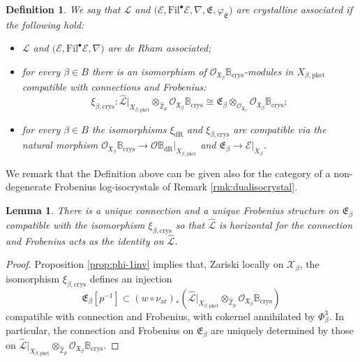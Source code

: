 \documentclass[asterisque,english]{smfart}
\newtheorem{definition}{Definition}[]
\newtheorem{lemma}[theo]{Lemma}
\begin{document}
\begin{definition}\label{def:crysass}  We say that $\mathcal{L}$ and $\bigl(\mathcal{E},\mathrm{Fil}^\bullet \mathcal{E}, \nabla,\mathfrak{E},\varphi_{\mathfrak{E}}\bigr) $ are  crystalline  associated  if the following hold:

\begin{itemize} 

\item[i.]  $\mathcal{L}$ and $\bigl(\mathcal{E},\mathrm{Fil}^\bullet \mathcal{E},\nabla\bigr)$ are de Rham associated;

\item[ii.] for every $\beta\in B$ there is an isomorphism of $\mathcal{O}_{\mathfrak{X}_\beta}\mathbb{B}_{\mathrm{crys}}$-modules in $X_{\beta,\mathrm{pket}}$  compatible with connections and Frobenius: $$\xi_{\beta,\mathrm{crys}}\colon \widehat{\mathcal{L}}\vert_{X_{\beta,\mathrm{pket}}}\otimes_{\widehat{\mathbb{Z}}_p} \mathcal{O}_{\mathfrak{X}_\beta} \mathbb{B}_{\mathrm{crys}}\cong \mathfrak{E}_\beta\otimes_{\mathcal{O}_{\mathfrak{X}_\beta}}  \mathcal{O}_{\mathfrak{X}_\beta}\mathbb{B}_{\mathrm{crys}};$$

\item[iii.] for every $\beta\in B$ the isomorphisms $\xi_{\mathrm{dR}}$ and $\xi_{\beta,\mathrm{crys}}$ are compatible via the natural morphism $\mathcal{O}_{\mathfrak{X}_\beta}\mathbb{B}_{\mathrm{crys}}\to \mathcal{O}\mathbb{B}_{\mathrm{dR}}\vert_{X_{\beta,\mathrm{pket}}}$ and $\mathfrak{E}_\beta\to \mathcal{E}\vert_{X_\beta}$. 

\end{itemize}
\end{definition}

We remark that the Definition above can be given also for the category of a non-degenerate Frobenius log-isocrystals of  Remark \ref{rmk:dualisocrystal}.

\begin{lemma}\label{lemma:uniquenabla}
There is a unique connection and a unique Frobenius structure on $\mathfrak{E}_\beta$ compatible with the isomorphism $\xi_{\beta,\mathrm{crys}}$ so that $\widehat{\mathcal{L}}$ is horizontal for the connection and Frobenius acts as the identity on $\widehat{\mathcal{L}}$.
\end{lemma} 
\begin{proof}
 Proposition \ref{prop:phi-1inv} implies that, Zariski locally on $\mathcal{X}_\beta$,  the isomorphism $\xi_{\beta,\mathrm{crys}}$ defines an injection $$\mathfrak{E}_\beta[p^{-1}]\subset   (w\circ \nu_{\mathrm{ar}})_\ast\left( \widehat{\mathcal{L}}\vert_{X_{\beta,\mathrm{pket}}}\otimes_{\widehat{\mathbb{Z}}_p} \mathcal{O}_{\mathfrak{X}_\beta} \mathbb{B}_{\mathrm{crys}}\right)$$compatible with connection and Frobenius, with cokernel annihilated by $\Phi_{\beta}^3$. In particular, the connection and Frobenius on $\mathfrak{E}_\beta$ are uniquely determined by those on $ \widehat{\mathcal{L}}\vert_{X_{\beta,\mathrm{pket}}}\otimes_{\widehat{\mathbb{Z}}_p} \mathcal{O}_{\mathfrak{X}_\beta} \mathbb{B}_{\mathrm{crys}}$. 
\end{proof}
\end{document}
